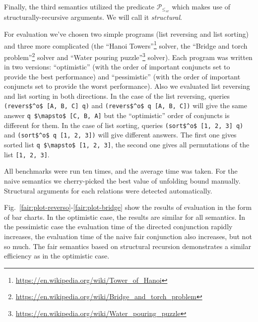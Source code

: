 Finally, the third semantics utilized the predicate $\mathcal{P}_{\leq_{sr}}$ which makes use of structurally-recursive arguments. We will call it \emph{structural}.

For evaluation we've chosen two simple programs (list reversing and list sorting) and three more complicated (the ``Hanoi Towers''\footnote{\url{https://en.wikipedia.org/wiki/Tower_of_Hanoi}} solver, the
``Bridge and torch problem''\footnote{\url{https://en.wikipedia.org/wiki/Bridge_and_torch_problem}} solver and ``Water pouring puzzle''\footnote{\url{https://en.wikipedia.org/wiki/Water_pouring_puzzle}} solver).
Each program was written in two versions: ``optimistic'' (with the order of important conjuncts set to provide the best performance) and ``pessimistic'' (with the order of important
conjuncts set to provide the worst performance). Also we evaluated list reversing and list sorting in both directions. In the case of the list reversing, queries
\lstinline{(revers$^o$ [A, B, C] q)} and \lstinline{(revers$^o$ q [A, B, C])}\! will give the same answer \lstinline{q $\mapsto$ [C, B, A]} but the ``optimistic'' order of conjuncts is different
for them. In the case of list sorting, queries \lstinline{(sort$^o$ [1, 2, 3] q)} and \lstinline{(sort$^o$ q [1, 2, 3])} will give different answers. The first one gives sorted list
\lstinline{q $\mapsto$ [1, 2, 3]}, the second one gives all permutations of the list \lstinline{[1, 2, 3]}. 

All benchmarks were run ten times, and the average time was taken. For the naive  semantics we cherry-picked the best value of unfolding bound manually. Structural arguments for each relations were detected automatically.

Fig.~\ref{fair:plot-reverso}-\ref{fair:plot-bridge} show the results of evaluation in the form of bar charts. In the optimistic case, the results are similar for all semantics.
In the pessimistic case the evaluation time of the directed conjunction rapidly increases, the evaluation time of the naive fair conjunction also increases, but not so much.
The fair semantics based on structural recursion demonstrates a similar efficiency as in the optimistic case.

